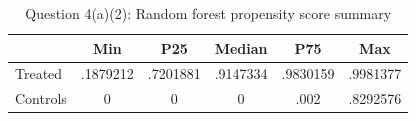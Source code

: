 \begin{table}[htbp]\centering
\caption{Question 4(a)(2): Random forest propensity score summary}
\begin{tabular}{l*{5}{c}}
\hline\hline
            &         Min&         P25&      Median&         P75&         Max\\
\hline
Treated     &    .1879212&    .7201881&    .9147334&    .9830159&    .9981377\\
Controls    &           0&           0&           0&        .002&    .8292576\\
\hline\hline
\end{tabular}
\end{table}
